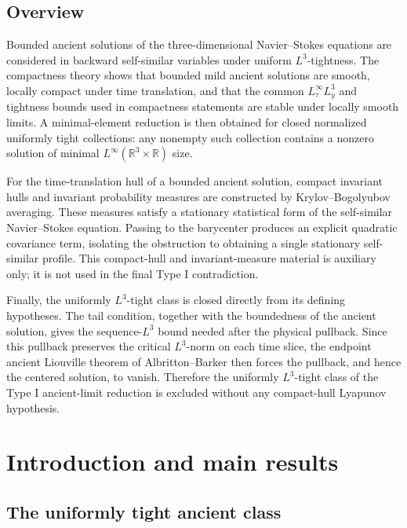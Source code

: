 \documentclass[11pt]{amsart}
\theoremstyle{plain}
\theoremstyle{definition}
\theoremstyle{remark}
\numberwithin{equation}{section}
\newcommand{\R}{\mathbb R}
\begin{document}
\subsection*{Overview}

Bounded ancient solutions of the three-dimensional Navier--Stokes equations
are considered in backward self-similar variables under uniform
\(L^3\)-tightness.  The compactness theory shows that bounded mild
ancient solutions are smooth, locally compact under time translation, and that
the common \(L^\infty_\tau L^3_y\) and tightness bounds used in compactness
statements are stable under locally smooth limits.  A minimal-element reduction
is then obtained for closed normalized uniformly tight collections:
any nonempty such collection contains a nonzero solution of minimal
\(L^\infty(\R^3\times\R)\) size.

For the time-translation hull of a bounded ancient solution, compact invariant
hulls and invariant probability measures are constructed by
Krylov--Bogolyubov averaging.  These measures satisfy a stationary statistical form of the
self-similar Navier--Stokes equation.  Passing to the barycenter produces an
explicit quadratic covariance term, isolating the obstruction to obtaining a
single stationary self-similar profile.
This compact-hull and invariant-measure material is auxiliary only; it is
not used in the final Type I contradiction.

Finally, the uniformly \(L^3\)-tight class is closed directly from its defining
hypotheses.  The tail condition, together with the boundedness of the ancient
solution, gives the sequence-\(L^3\) bound needed after the physical pullback.
Since this pullback preserves the critical \(L^3\)-norm on each time slice,
the endpoint ancient Liouville theorem of Albritton--Barker then forces the
pullback, and hence the centered solution, to vanish.  Therefore the uniformly
\(L^3\)-tight class of the Type I
ancient-limit reduction is excluded without any compact-hull Lyapunov
hypothesis.

\section{Introduction and main results}\label{p2:sec:introduction}

\subsection{The uniformly tight ancient class}
\end{document}
